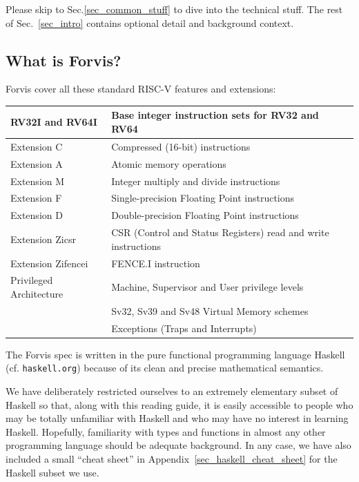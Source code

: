 \documentclass[11pt]{article}
\begin{document}
Please skip to Sec.\ref{sec_common_stuff} to dive into the technical
stuff.  The rest of Sec.~\ref{sec_intro} contains optional detail and
background context.


\subsection{What is Forvis?}

Forvis cover all these standard RISC-V features and extensions:

\begin{center}
\begin{tabular}{|l|l|}
\hline
RV32I and RV64I  & Base integer instruction sets for RV32 and RV64 \\
\hline
Extension C      & Compressed (16-bit) instructions \\
\hline
Extension A      & Atomic memory operations \\
\hline
Extension M      & Integer multiply and divide instructions \\
\hline
Extension F      & Single-precision Floating Point instructions \\
\hline
Extension D      & Double-precision Floating Point instructions \\
\hline
Extension Zicsr  & CSR (Control and Status Registers) read and write instructions\\
\hline
Extension Zifencei  & FENCE.I instruction \\
\hline
Privileged Architecture  & Machine, Supervisor and User privilege levels \\
                         & Sv32, Sv39 and Sv48 Virtual Memory schemes \\
			 & Exceptions (Traps and Interrupts) \\
\hline
\end{tabular}
\end{center}

The Forvis spec is written in the pure functional programming language
Haskell~\cite{PeytonJones2003} (cf. {\tt haskell.org}) because of its
clean and precise mathematical semantics.

We have deliberately restricted ourselves to an extremely elementary
subset of Haskell so that, along with this reading guide, it is easily
accessible to people who may be totally unfamiliar with Haskell and
who may have no interest in learning Haskell.  Hopefully, familiarity
with types and functions in almost any other programming language
should be adequate background.  In any case, we have also included a
small ``cheat sheet'' in Appendix~\ref{sec_haskell_cheat_sheet} for
the Haskell subset we use.
\end{document}
